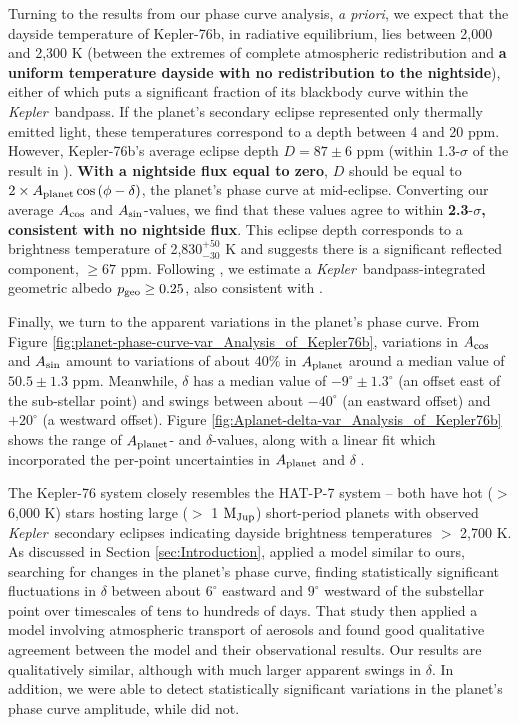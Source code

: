 \documentclass[manuscript]{aastex62}
\newcommand{\kepler}{{\it Kepler}}
\begin{document}
Turning to the results from our phase curve analysis, \emph{a priori}, we expect that the dayside temperature of Kepler-76b, in radiative equilibrium, lies between 2,000 and 2,300 K (between the extremes of complete atmospheric redistribution and \textbf{a uniform temperature dayside with no redistribution to the nightside}), either of which puts a significant fraction of its blackbody curve within the \kepler\ bandpass. If the planet's secondary eclipse represented only thermally emitted light, these temperatures correspond to a depth between 4 and 20 ppm. However, Kepler-76b's average eclipse depth $D = 87 \pm 6$ ppm (within 1.3-$\sigma$ of the result in  \citealt{2013ApJ...771...26F}). \textbf{With a nightside flux equal to zero}, $D$ should be equal to $2\times A_{\rm planet} \cos \left( \phi - \delta \right)$, the planet's phase curve at mid-eclipse. Converting our average $A_{\rm cos}$ and $A_{\rm sin}$-values, we find that these values agree to within \textbf{2.3}-$\sigma$\textbf{, consistent with no nightside flux}. This eclipse depth corresponds to a brightness temperature of 2,830$^{+50}_{-30}$ K and suggests there is a significant reflected component, $\geq 67$ ppm. Following \citet{2011MNRAS.415.3921F}, we estimate a \kepler\ bandpass-integrated geometric albedo $p_{\rm geo} \geq 0.25$, also consistent with \citet{2013ApJ...771...26F}. \textbf{}

Finally, we turn to the apparent variations in the planet's phase curve. From Figure \ref{fig:planet-phase-curve-var_Analysis_of_Kepler76b}, variations in $A_{\rm cos}$ and $A_{\rm sin}$ amount to variations of about 40\% in $A_{\rm planet}$ around a median value of $50.5 \pm 1.3$ ppm. Meanwhile, $\delta$ has a median value of $-9^\circ \pm 1.3^\circ$ (an offset east of the sub-stellar point) and swings between about $-40^\circ$ (an eastward offset) and $+20^\circ$ (a westward offset). Figure \ref{fig:Aplanet-delta-var_Analysis_of_Kepler76b} shows the range of $A_{\rm planet}$- and $\delta$-values, along with a linear fit which incorporated the per-point uncertainties in $A_{\rm planet}$ and $\delta$ \citep{boggs1990orthogonal}.

The Kepler-76 system closely resembles the HAT-P-7 system -- both have hot ($>$ 6,000 K) stars hosting large ($>$ 1 ${\rm M_{Jup}}$) short-period planets with observed \kepler\ secondary eclipses indicating dayside brightness temperatures $>$ 2,700 K. As discussed in Section \ref{sec:Introduction}, \citet{2016NatAs...1E...4A} applied a model similar to ours, searching for changes in the planet's phase curve, finding statistically significant fluctuations in $\delta$ between about $6^\circ$ eastward and $9^\circ$ westward of the substellar point over timescales of tens to hundreds of days. That study then applied a model involving atmospheric transport of aerosols and found good qualitative agreement between the model and their observational results. Our results are qualitatively similar, although with much larger apparent swings in $\delta$. In addition, we were able to detect statistically significant variations in the planet's phase curve amplitude, while \citet{2016NatAs...1E...4A} did not.
\end{document}
